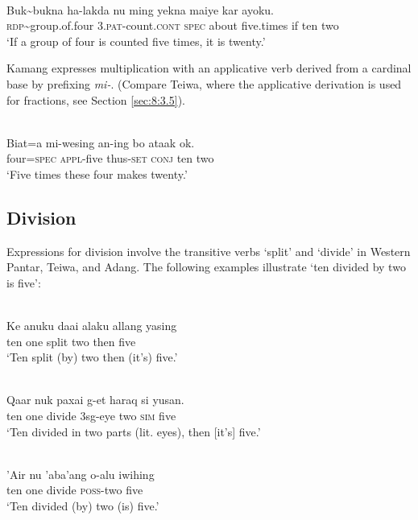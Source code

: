 \documentclass[output=paper]{LSP/langsci}
\begin{document}
\ea
\label{ex:8:1245}
\\ 
 \gll Buk\~{}bukna  ha-lakda  nu  ming  yekna  maiye  kar ayoku. \\
  \textsc{rdp}\~{}group.of.four  \textsc{3.pat}-count.\textsc{cont}  \textsc{spec}  about  five.times  if  ten two  \\
 \glt  `If a group of four is counted five times, it is twenty.'
\z

 

Kamang expresses multiplication with an applicative verb derived from a cardinal base by prefixing \textit{mi-}. (Compare Teiwa, where the applicative derivation is used for fractions, see Section \ref{sec:8:3.5}). 




\ea%
\label{bkm:Ref358043179}
\\
\gll   Biat=a  mi-wesing  an-ing  bo  ataak   ok.  \\  
    four=\textsc{spec}  \textsc{appl-}five  thus\textsc{-set}  \textsc{conj} ten  two   \\
\glt  `Five times these four makes twenty.'
\z


\subsection{Division}
\label{sec:8:Division}
Expressions for division involve the transitive verbs `split' and `divide' in Western Pantar, Teiwa, and Adang. The following examples illustrate `ten divided by two is five': 


\ea%
\label{bkm:Ref342664493}
\\
 
\gll   Ke anuku  daai  alaku  allang  yasing\\  
    ten one  split  two  then  five \\
\glt `Ten split (by) two then (it's) five.'
\z



 

 


\ea
\label{ex:8:1246}
\\  
 \gll Qaar  nuk  paxai  g-et  haraq  si  yusan.   \\
  ten  one  divide  3sg-eye  two  \textsc{sim}  five   \\
 \glt `Ten divided in two parts (lit. eyes), then [it's] five.'
\z
 

\ea%
\label{bkm:Ref342664505}
\\
\gll  'Air nu  'aba'ang  o-alu  iwihing\\  
    ten one  divide  \textsc{poss-}two  five \\
\glt `Ten divided (by) two (is) five.'  
\z
\end{document}
